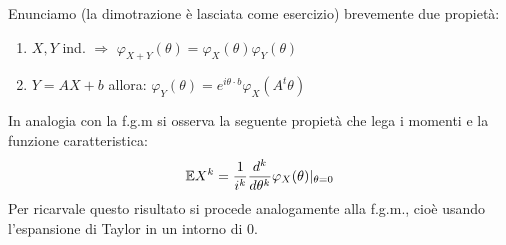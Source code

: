 \vspace{10px}
\newcommand{\Tt}{\theta}

Enunciamo (la dimotrazione è lasciata come esercizio) brevemente due propietà:
\begin{enumerate}
    \item $X,Y$ ind. $\Rightarrow$ $\varphi_{X+Y}(\theta)=\varphi_X(\Tt)\varphi_Y(\Tt)$
    \item $Y=AX+b$ allora: $\varphi_Y(\Tt)=e^{i\Tt\cdot b}\varphi_{X}(A^t\Tt)$
\end{enumerate}

\vspace{5px}

In analogia con la f.g.m si osserva la seguente propietà che lega i momenti e la funzione caratteristica:
\[\E X^k = \frac{1}{i^k}\frac{d^k}{d\Tt^k}\varphi_X(\Tt)|_{\Tt=0}\]
Per ricarvale questo risultato si procede analogamente alla f.g.m., cioè usando l'espansione di Taylor in un intorno di $0$.